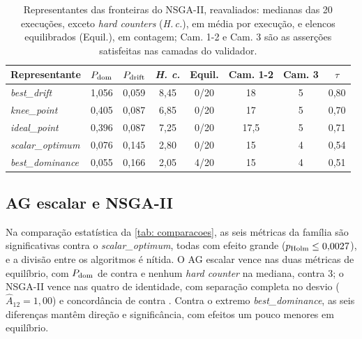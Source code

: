 \begin{table}[htb]
    \caption[Representantes das fronteiras do NSGA-II]{Representantes das fronteiras do NSGA-II, reavaliados: medianas das 20 execuções, exceto \textit{hard counters} (\textit{H.\,c.}), em média por execução, e elencos equilibrados (Equil.), em contagem; Cam. 1-2 e Cam. 3 são as asserções satisfeitas nas camadas do validador.}
    \label{tab: representantes}
    \centering
    \small
    \begin{tabular}{l c c c c c c c}
        \toprule
        \textbf{Representante} & $P_{\mathrm{dom}}$ & $P_{\mathrm{drift}}$ & \textbf{\textit{H. c.}} & \textbf{Equil.} & \textbf{Cam. 1-2} & \textbf{Cam. 3} & $\tau$ \\
        \midrule
        \textit{best\_drift}     & 1,056 & 0,059 & 8,45 & 0/20 & 18   & 5 & 0,80 \\
        \textit{knee\_point}     & 0,405 & 0,087 & 6,85 & 0/20 & 17   & 5 & 0,70 \\
        \textit{ideal\_point}    & 0,396 & 0,087 & 7,25 & 0/20 & 17,5 & 5 & 0,71 \\
        \textit{scalar\_optimum} & 0,076 & 0,145 & 2,80 & 0/20 & 15   & 4 & 0,54 \\
        \textit{best\_dominance} & 0,055 & 0,166 & 2,05 & 4/20 & 15   & 4 & 0,51 \\
        \bottomrule
    \end{tabular}
    \source
\end{table}

\subsection{AG escalar e NSGA-II}
\label{sub: res_ag_nsga}

Na comparação estatística da \autoref{tab: comparacoes}, as seis métricas da família são significativas contra o \textit{scalar\_optimum}, todas com efeito grande ($p_{\mathrm{Holm}} \le 0{,}0027{}$), e a divisão entre os algoritmos é nítida. O AG escalar vence nas duas métricas de equilíbrio, com $P_{\mathrm{dom}}$ de \domAG{} contra \domNSGA{} e nenhum \textit{hard counter} na mediana, contra 3; o NSGA-II vence nas quatro de identidade, com separação completa no desvio ($\hat{A}_{12} = 1{,}00$) e concordância de \tauNSGA{} contra \tauAG{}. Contra o extremo \textit{best\_dominance}, as seis diferenças mantêm direção e significância, com efeitos um pouco menores em equilíbrio.

